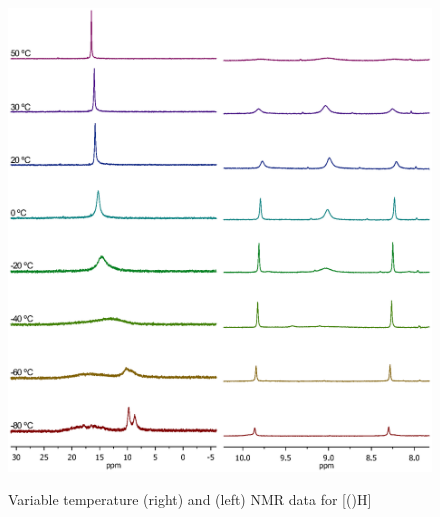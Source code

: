 {\begin{figure}[h!]
\begin{center}
\vspace{0.5cm}
\includegraphics[scale=0.8, trim = 0cm 6.8cm 0cm 2cm]{../NMR/PhosphoniumVTNMRboth.eps}
\caption[Variable temperature \phosphorus{} and \proton{} NMR data for {[}(\tButhixantphos)H{]}]{Variable temperature \phosphorus{} (right) and \proton{} (left) NMR data for [(\tButhixantphos)H]}
\vspace{0.2cm}
\label{VTStBuH}
\end{center}
\end{figure}
\vspace{0.2cm}


}

